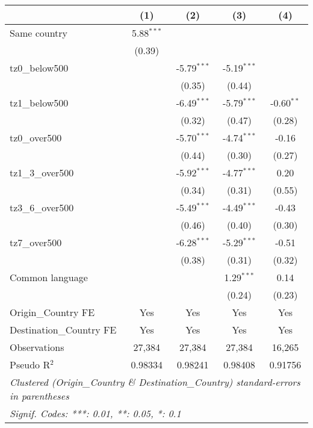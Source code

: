 
\begingroup
\centering
\small
\begin{tabular}{lcccc}
   \toprule
                            & (1)          & (2)           & (3)           & (4)\\  
   \midrule 
   Same country             & 5.88$^{***}$ &               &               &   \\   
                            & (0.39)       &               &               &   \\   
   tz0\_below500            &              & -5.79$^{***}$ & -5.19$^{***}$ &   \\   
                            &              & (0.35)        & (0.44)        &   \\   
   tz1\_below500            &              & -6.49$^{***}$ & -5.79$^{***}$ & -0.60$^{**}$\\   
                            &              & (0.32)        & (0.47)        & (0.28)\\   
   tz0\_over500             &              & -5.70$^{***}$ & -4.74$^{***}$ & -0.16\\   
                            &              & (0.44)        & (0.30)        & (0.27)\\   
   tz1\_3\_over500          &              & -5.92$^{***}$ & -4.77$^{***}$ & 0.20\\   
                            &              & (0.34)        & (0.31)        & (0.55)\\   
   tz3\_6\_over500          &              & -5.49$^{***}$ & -4.49$^{***}$ & -0.43\\   
                            &              & (0.46)        & (0.40)        & (0.30)\\   
   tz7\_over500             &              & -6.28$^{***}$ & -5.29$^{***}$ & -0.51\\   
                            &              & (0.38)        & (0.31)        & (0.32)\\   
   Common language          &              &               & 1.29$^{***}$  & 0.14\\   
                            &              &               & (0.24)        & (0.23)\\   
   \midrule 
   Origin\_Country FE       & Yes          & Yes           & Yes           & Yes\\  
   Destination\_Country FE  & Yes          & Yes           & Yes           & Yes\\  
   \midrule 
   Observations             & 27,384       & 27,384        & 27,384        & 16,265\\  
   Pseudo R$^2$             & 0.98334      & 0.98241       & 0.98408       & 0.91756\\  
   \bottomrule
   \multicolumn{5}{l}{\emph{Clustered (Origin\_Country \& Destination\_Country) standard-errors in parentheses}}\\
   \multicolumn{5}{l}{\emph{Signif. Codes: ***: 0.01, **: 0.05, *: 0.1}}\\
\end{tabular}
\par\endgroup


